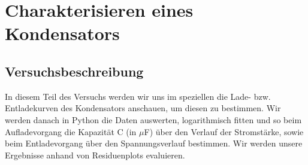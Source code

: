 \documentclass[12pt,a4paper]{article}
\author{Gruppe C14 \\ Julián Häck, Martin Koytek, Lars Wenning, Erik Zimmermann}
\begin{document}
\section{Charakterisieren eines Kondensators}
\subsection{Versuchsbeschreibung}
In diesem Teil des Versuchs werden wir uns im speziellen die Lade- bzw. Entladekurven des Kondensators anschauen, um diesen zu bestimmen. Wir werden danach in Python die Daten auswerten, logarithmisch fitten und so beim Aufladevorgang die Kapazität C (in $\mu$F) über den Verlauf der Stromstärke, sowie beim Entladevorgang über den Spannungsverlauf bestimmen. Wir werden unsere Ergebnisse anhand von Residuenplots evaluieren.\\
\end{document}
